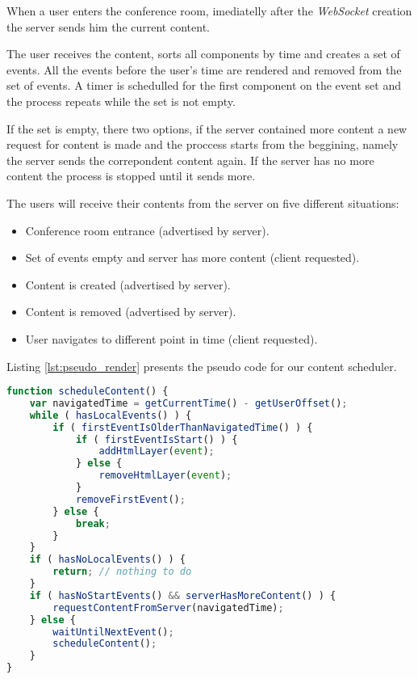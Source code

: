 	When a user enters the conference room, imediatelly after the \emph{WebSocket} creation the server sends him the current content.

	The user receives the content, sorts all components by time and creates a set of events. All the events before the user's time are rendered and removed from the set of events. A timer is schedulled for the first component on the event set and the process repeats while the set is not empty.

	If the set is empty, there two options, if the server contained more content a new request for content is made and the proccess starts from the beggining, namely the server sends the correpondent content again. If the server has no more content the process is stopped until it sends more.

	The users will receive their contents from the server on five different situations:

	\begin{itemize}
		\item Conference room entrance (advertised by server).
		\item Set of events empty and server has more content (client requested).
		\item Content is created (advertised by server).
		\item Content is removed (advertised by server).
		\item User navigates to different point in time (client requested).
	\end{itemize}

	Listing \ref{lst:pseudo_render} presents the pseudo code for our content scheduler.

\begin{minipage}{\linewidth}
\begin{lstlisting}[caption={Pseudo code for hyper content scheduler},label={lst:pseudo_render},language=JavaScript]
function scheduleContent() {
    var navigatedTime = getCurrentTime() - getUserOffset();
    while ( hasLocalEvents() ) {
        if ( firstEventIsOlderThanNavigatedTime() ) {
            if ( firstEventIsStart() ) {
            	addHtmlLayer(event);
            } else {
            	removeHtmlLayer(event);
            }
            removeFirstEvent();
        } else {
            break;
        }
    }
    if ( hasNoLocalEvents() ) {
    	return;	// nothing to do
    } 
    if ( hasNoStartEvents() && serverHasMoreContent() ) { 
       	requestContentFromServer(navigatedTime);
    } else {
        waitUntilNextEvent();
        scheduleContent();
    }
}
\end{lstlisting}
\end{minipage}

